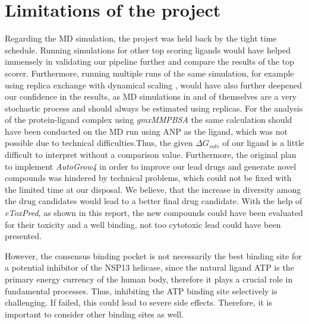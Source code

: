 \documentclass[11pt, letterpaper, titlepage]{article}
\renewcommand{\cite}{\parencite}
\begin{document}
\section{Limitations of the project}
Regarding the \acf{MD} simulation, the project was held back by the tight time schedule. Running simulations for other top scoring ligands would have helped immensely in validating our pipeline further and compare the results of the top scorer. Furthermore, running multiple runs of the same simulation, for example using replica exchange with dynamical scaling \cite{REDS}, would have also further deepened our confidence in the results, as \ac{MD} simulations in and of themselves are a very stochastic process and should always be estimated using replicas. For the analysis of the protein-ligand complex using \textit{gmxMMPBSA} the same calculation should have been conducted on the MD run using ANP as the ligand, which was not possible due to technical difficulties.Thus, the given $\Delta G_{solv}$ of our ligand is a little difficult to interpret without a comparison value.
Furthermore, the original plan to implement \textit{AutoGrow4} \cite{packageAutogrow4} in order to improve our lead drugs and generate novel compounds was hindered by technical problems, which could not be fixed with the limited time at our disposal. We believe, that the increase in diversity among the drug candidates would lead to a better final drug candidate. With the help of \textit{eToxPred}, as shown in this report, the new compounds could have been evaluated for their toxicity and a well binding, not too cytotoxic lead could have been presented. 

However, the consensus binding pocket is not necessarily the best binding site for a potential inhibitor of the NSP13 helicase, since the natural ligand ATP is the primary energy currency of the human body, therefore it plays a crucial role in fundamental processes. Thus, inhibiting the ATP binding site selectively is challenging. If failed, this could lead to severe side effects. Therefore, it is important to consider other binding sites as well. %
\end{document}
